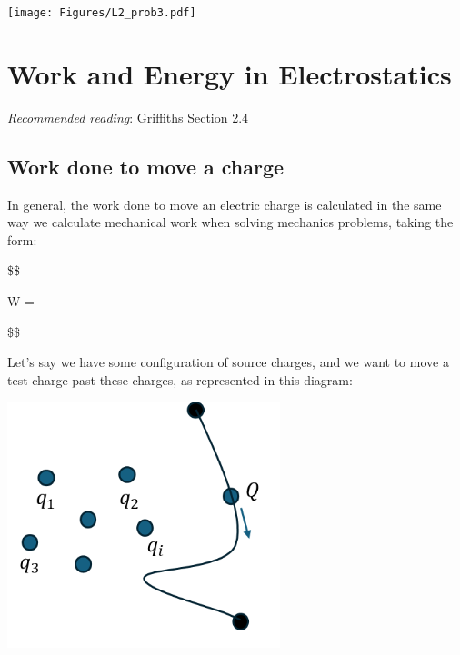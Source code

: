 \documentclass[
  letterpaper,
  DIV=11,
  numbers=noendperiod]{scrreprt}
\begin{document}
\texttt{[image: Figures/L2\_prob3.pdf]}


\chapter{Work and Energy in
Electrostatics}\label{work-and-energy-in-electrostatics}

\newcommand{\l}{\mathrm{\mathbf{l}}}
\newcommand{\E}{\mathrm{\mathbf{E}}}
\newcommand{\F}{\mathrm{\mathbf{F}}}
\newcommand{\r}{\mathrm{\mathbf{r}}}
\newcommand{\B}{\mathrm{\mathbf{B}}}
\newcommand{\A}{\mathrm{\mathbf{A}}}
\newcommand{\x}{\mathrm{\mathbf{x}}}
\newcommand{\y}{\mathrm{\mathbf{y}}}
\newcommand{\z}{\mathrm{\mathbf{z}}}
\newcommand{\v}{\mathrm{\mathbf{v}}}
\newcommand{\p}{\mathrm{\mathbf{p}}}
\newcommand{\d}{\mathrm{\mathbf{d}}}

\newcommand{\a}{\mathrm{\mathbf{a}}}
\newcommand{\b}{\mathrm{\mathbf{b}}}
\newcommand{\I}{\mathrm{\mathbf{I}}}
\newcommand{\K}{\mathrm{\mathbf{K}}}
\newcommand{\J}{\mathrm{\mathbf{J}}}
\newcommand{\A}{\mathrm{\mathbf{A}}}
\newcommand{\dd}{\mathrm{d}}

\emph{Recommended reading}: Griffiths Section 2.4

\section{Work done to move a charge}\label{work-done-to-move-a-charge}

In general, the work done to move an electric charge is calculated in
the same way we calculate mechanical work when solving mechanics
problems, taking the form:

\$\$

W = \int {} \cdot {}  

\$\$

Let's say we have some configuration of source charges, and we want to
move a test charge past these charges, as represented in this diagram:

\includegraphics[width=3.125in,height=\textheight]{Figures/workdone_charge.png}
\end{document}
